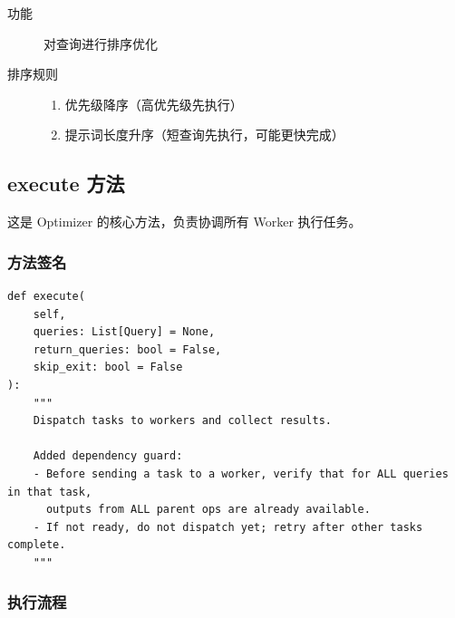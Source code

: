 \documentclass[12pt,a4paper]{article}
\begin{document}
\begin{description}
    \item[功能] 对查询进行排序优化
    \item[排序规则]
    \begin{enumerate}
        \item 优先级降序（高优先级先执行）
        \item 提示词长度升序（短查询先执行，可能更快完成）
    \end{enumerate}
\end{description}

\subsection{execute 方法}

这是 Optimizer 的核心方法，负责协调所有 Worker 执行任务。

\subsubsection{方法签名}

\begin{lstlisting}
def execute(
    self,
    queries: List[Query] = None,
    return_queries: bool = False,
    skip_exit: bool = False
):
    """
    Dispatch tasks to workers and collect results.
    
    Added dependency guard:
    - Before sending a task to a worker, verify that for ALL queries in that task,
      outputs from ALL parent ops are already available.
    - If not ready, do not dispatch yet; retry after other tasks complete.
    """
\end{lstlisting}

\subsubsection{执行流程}
\end{document}
